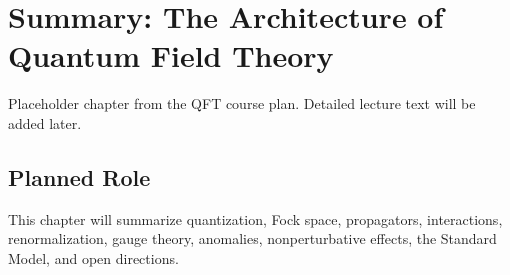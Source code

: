 \chapter{Summary: The Architecture of Quantum Field Theory}

\begin{remarkbox}
Placeholder chapter from the QFT course plan. Detailed lecture text will be added later.
\end{remarkbox}

\section{Planned Role}

This chapter will summarize quantization, Fock space, propagators, interactions, renormalization, gauge theory, anomalies, nonperturbative effects, the Standard Model, and open directions.

